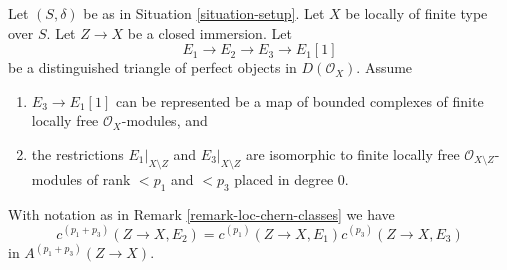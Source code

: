 \begin{lemma}
\label{lemma-additivity-loc-chern-c}
Let $(S, \delta)$ be as in Situation \ref{situation-setup}.
Let $X$ be locally of finite type over $S$. Let $Z \to X$ be
a closed immersion. Let
$$
E_1 \to E_2 \to E_3 \to E_1[1]
$$
be a distinguished triangle of perfect objects in $D(\mathcal{O}_X)$.
Assume
\begin{enumerate}
\item $E_3 \to E_1[1]$ can be represented be a map of bounded complexes
of finite locally free $\mathcal{O}_X$-modules, and
\item the restrictions $E_1|_{X \setminus Z}$ and $E_3|_{X \setminus Z}$
are isomorphic to finite locally free $\mathcal{O}_{X \setminus Z}$-modules
of rank $< p_1$ and $< p_3$ placed in degree $0$.
\end{enumerate}
With notation as in Remark \ref{remark-loc-chern-classes} we have
$$
c^{(p_1 + p_3)}(Z \to X, E_2) = c^{(p_1)}(Z \to X, E_1)c^{(p_3)}(Z \to X, E_3)
$$
in $A^{(p_1 + p_3)}(Z \to X)$.
\end{lemma}

